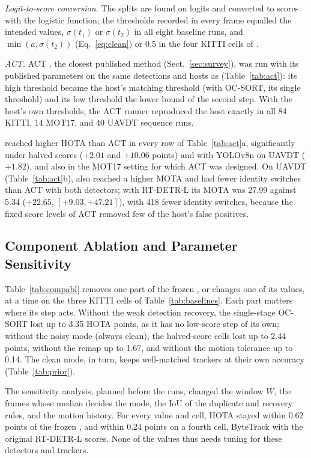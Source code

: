 

\emph{Logit-to-score conversion.} The splits are found on logits and converted to scores with the
logistic function; the thresholds recorded in every frame equalled the intended values, $\sigma(t_1)$
or $\sigma(t_2)$ in all eight baseline runs, and $\min(a,\sigma(t_2))$ (Eq.~\eqref{eq:clean}) or 0.5
in the four KITTI cells of \scl{}.

\emph{ACT.} ACT \cite{act2026adaptive}, the closest published method (Sect.~\ref{sec:survey}), was run with its published parameters on the same detections and hosts as
\scl{} (Table~\ref{tab:act}): its high threshold became the host's matching threshold (with OC-SORT,
its single threshold) and its low threshold the lower bound of the second step. With the host's own
thresholds, the ACT runner reproduced the host exactly in all 84 KITTI, 14 MOT17, and 40 UAVDT
sequence runs.



\scl{} reached
higher HOTA than ACT in every row of Table~\ref{tab:act}a, significantly under halved scores
($+2.01$ and $+10.06$ points) and with YOLOv8n on UAVDT ($+1.82$), and also in the MOT17 setting for
which ACT was designed. On UAVDT (Table~\ref{tab:act}b), \scl{} also reached a higher MOTA and had
fewer identity switches than ACT with both detectors; with RT-DETR-L its MOTA was 27.99 against 5.34
($+22.65$, $[+9.03,+47.21]$), with 418 fewer identity switches, because the fixed score levels of
ACT removed few of the host's false positives.

\subsection{Component Ablation and Parameter Sensitivity}\label{sec:ablation}
Table~\ref{tab:compabl} removes one part of the frozen \scl{}, or changes one of its values, at a
time on the three KITTI cells of Table~\ref{tab:baselines}. Each part matters where its step acts.
Without the weak detection recovery, the single-stage OC-SORT lost up to 3.35 HOTA points, as it has
no low-score step of its own; without the noisy mode (always clean), the halved-score cells lost up
to 2.44 points, without the remap up to 1.67, and without the motion tolerance up to 0.14. The clean
mode, in turn, keeps well-matched trackers at their own accuracy (Table~\ref{tab:prior}).



The sensitivity analysis, planned before the runs, changed the window $W$, the frames whose median
decides the mode, the IoU of the duplicate and recovery rules, and the motion history. For every
value and cell, HOTA stayed within 0.62 points of the frozen \scl{}, and within 0.24 points on a
fourth cell, ByteTrack with the original RT-DETR-L scores. None of the values thus needs tuning for
these detectors and trackers.

